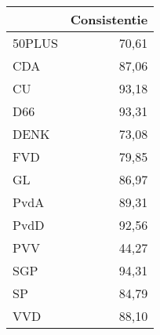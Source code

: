 \begin{tabular}{lr}
\toprule
{} &  Consistentie \\
\midrule
50PLUS &         70,61 \\
CDA    &         87,06 \\
CU     &         93,18 \\
D66    &         93,31 \\
DENK   &         73,08 \\
FVD    &         79,85 \\
GL     &         86,97 \\
PvdA   &         89,31 \\
PvdD   &         92,56 \\
PVV    &         44,27 \\
SGP    &         94,31 \\
SP     &         84,79 \\
VVD    &         88,10 \\
\bottomrule
\end{tabular}
